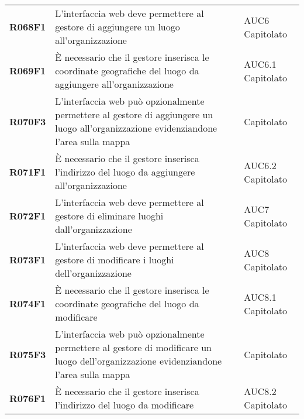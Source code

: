 \documentclass[../analisi-dei-requisiti.tex]{subfiles}
\begin{document}
\begin{longtable}[H]{>{\centering\bfseries}m{3cm} >{\centering}m{10cm} >{\centering\arraybackslash}m{3cm}}
  R068F1                               & L'interfaccia web deve permettere al gestore di aggiungere un luogo all'organizzazione                                                                                                                  & AUC6 Capitolato               \\
  R069F1                               & È necessario che il gestore inserisca le coordinate geografiche del luogo da aggiungere all'organizzazione                                                                                              & AUC6.1 Capitolato             \\
  R070F3                               & L'interfaccia web può opzionalmente permettere al gestore di aggiungere un luogo all'organizzazione evidenziandone l'area sulla mappa                                                                   & Capitolato                    \\
  R071F1                               & È necessario che il gestore inserisca l'indirizzo del luogo da aggiungere all'organizzazione                                                                                                            & AUC6.2 Capitolato             \\
  R072F1                               & L'interfaccia web deve permettere al gestore di eliminare luoghi dall'organizzazione                                                                                                                    & AUC7 Capitolato               \\
  R073F1                               & L'interfaccia web deve permettere al gestore di modificare i luoghi dell'organizzazione                                                                                                                 & AUC8 Capitolato               \\
  R074F1                               & È necessario che il gestore inserisca le coordinate geografiche del luogo da modificare                                                                                                                 & AUC8.1 Capitolato             \\
  R075F3                               & L'interfaccia web può opzionalmente permettere al gestore di modificare un luogo dell'organizzazione evidenziandone l'area sulla mappa                                                                  & Capitolato                    \\
  R076F1                               & È necessario che il gestore inserisca l'indirizzo del luogo da modificare                                                                                                                               & AUC8.2 Capitolato             \\

\end{longtable}
\end{document}
